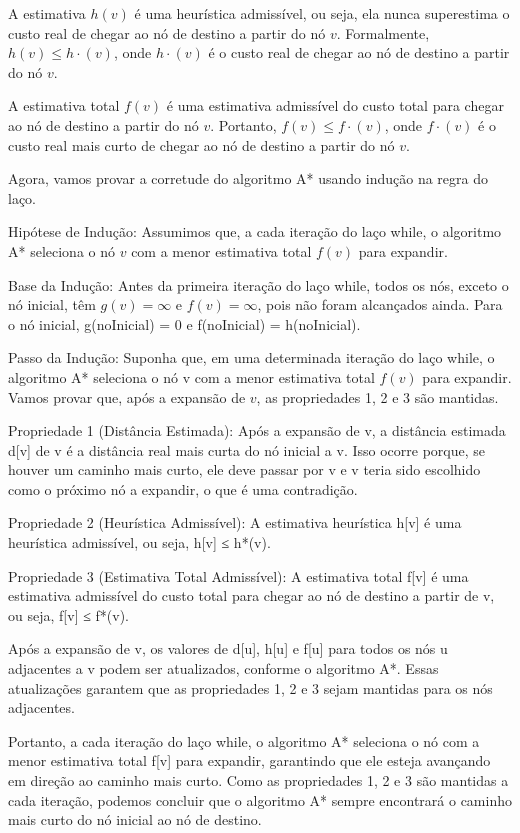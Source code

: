 A estimativa \(h(v)\) é uma heurística admissível, ou seja, ela nunca
superestima o custo real de chegar ao nó de destino a partir do nó
\(v\). Formalmente, \(h(v) ≤ h\cdot(v)\), onde \(h\cdot(v)\) é o custo
real de chegar ao nó de destino a partir do nó \(v\).

A estimativa total \(f(v)\) é uma estimativa admissível do custo total
para chegar ao nó de destino a partir do nó \(v\). Portanto,
\(f(v) ≤ f\cdot(v)\), onde \(f\cdot(v)\) é o custo real mais curto de
chegar ao nó de destino a partir do nó \(v\).

Agora, vamos provar a corretude do algoritmo A* usando indução na regra
do laço.

Hipótese de Indução: Assumimos que, a cada iteração do laço while, o
algoritmo A* seleciona o nó \(v\) com a menor estimativa total \(f(v)\)
para expandir.

Base da Indução: Antes da primeira iteração do laço while, todos os nós,
exceto o nó inicial, têm \(g(v) = ∞\) e \(f(v) = ∞\), pois não foram
alcançados ainda. Para o nó inicial, g(noInicial) = 0 e f(noInicial) =
h(noInicial).

Passo da Indução: Suponha que, em uma determinada iteração do laço
while, o algoritmo A* seleciona o nó v com a menor estimativa total
\(f(v)\) para expandir. Vamos provar que, após a expansão de \(v\), as
propriedades 1, 2 e 3 são mantidas.

Propriedade 1 (Distância Estimada): Após a expansão de v, a distância
estimada d{[}v{]} de v é a distância real mais curta do nó inicial a v.
Isso ocorre porque, se houver um caminho mais curto, ele deve passar por
v e v teria sido escolhido como o próximo nó a expandir, o que é uma
contradição.

Propriedade 2 (Heurística Admissível): A estimativa heurística h{[}v{]}
é uma heurística admissível, ou seja, h{[}v{]} ≤ h*(v).

Propriedade 3 (Estimativa Total Admissível): A estimativa total f{[}v{]}
é uma estimativa admissível do custo total para chegar ao nó de destino
a partir de v, ou seja, f{[}v{]} ≤ f*(v).

Após a expansão de v, os valores de d{[}u{]}, h{[}u{]} e f{[}u{]} para
todos os nós u adjacentes a v podem ser atualizados, conforme o
algoritmo A*. Essas atualizações garantem que as propriedades 1, 2 e 3
sejam mantidas para os nós adjacentes.

Portanto, a cada iteração do laço while, o algoritmo A* seleciona o nó
com a menor estimativa total f{[}v{]} para expandir, garantindo que ele
esteja avançando em direção ao caminho mais curto. Como as propriedades
1, 2 e 3 são mantidas a cada iteração, podemos concluir que o algoritmo
A* sempre encontrará o caminho mais curto do nó inicial ao nó de
destino.

